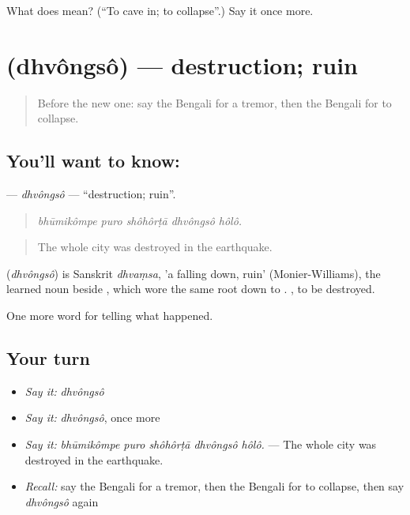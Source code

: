 \begin{tcolorbox}[breakable,colback=teal!4,colframe=teal!35!black,title={Before you move on}]
What does   mean? (\textquotedblleft{}To cave in; to collapse\textquotedblright{}.) Say it once more.
\end{tcolorbox}
\section[\texorpdfstring{\bn{ধ্বংস} (dhvôngsô)}{ধ্বংস (dhvôngsô)}]{ (dhvôngsô) — destruction; ruin}

\label{lesson:BN-C293-dhvongso}



\begin{quote}
Before the new one: say the Bengali for a tremor, then the Bengali for to collapse.
\end{quote}

\subsection*{You'll want to know: }
\textbf{} — \emph{dhvôngsô} — \textquotedblleft{}destruction; ruin\textquotedblright{}.

\begin{quote}
    
\end{quote}

\begin{quote}
\emph{bhūmikômpe puro shôhôrṭā dhvôngsô hôlô.}
\end{quote}

\begin{quote}
The whole city was destroyed in the earthquake.
\end{quote}

\begin{cousinweb}
\textbf{} (\emph{dhvôngsô}) is Sanskrit \emph{dhvaṃsa}, 'a falling down, ruin' (Monier-Williams), the learned noun beside \textbf{ }, which wore the same root down to .  , to be destroyed.
\end{cousinweb}

\begin{grammarlens}[title={What you've built}]
One more word for telling what happened.
\end{grammarlens}

\subsection*{Your turn}
\begin{itemize}
\raggedright
  \item \emph{Say it:} \emph{dhvôngsô}
  \item \emph{Say it:} \emph{dhvôngsô}, once more
  \item \emph{Say it:} \emph{bhūmikômpe puro shôhôrṭā dhvôngsô hôlô.} — The whole city was destroyed in the earthquake.
  \item \emph{Recall:} say the Bengali for a tremor, then the Bengali for to collapse, then say \emph{dhvôngsô} again
\end{itemize}

